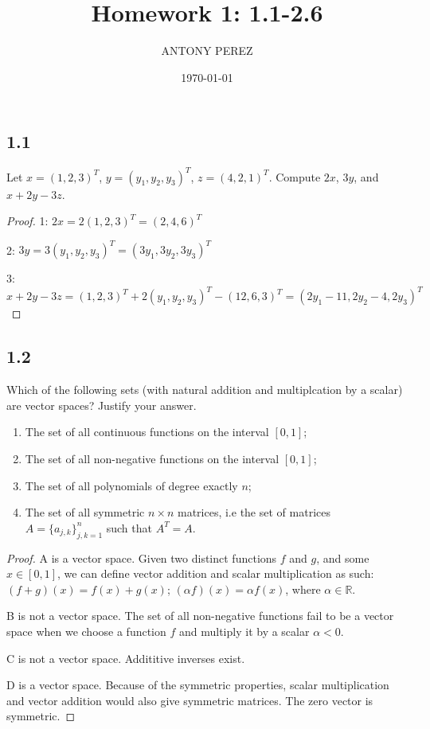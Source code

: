 \documentclass{amsart}
\title{Homework 1: 1.1-2.6}
\author{ANTONY PEREZ}
\date{\today}
\begin{document}
\maketitle
\subsection*{1.1}
Let $x = (1,2,3)^{T}$, $y=(y_1,y_2,y_3)^{T}$, $z=(4,2,1)^{T}$. Compute $2x$, $3y$, and $x+2y-3z$.
\begin{proof}
    1: $2x = 2(1,2,3)^{T} = (2,4,6)^{T}$
    
    2: $3y = 3(y_1,y_2,y_3)^{T} = (3y_1,3y_2,3y_3)^{T}$
    
    3: $x+2y-3z = (1,2,3)^{T} + 2(y_1,y_2,y_3)^{T} - (12,6,3)^{T} = (2y_1 - 11, 2y_2 - 4, 2y_3)^{T}$
\end{proof}
\subsection*{1.2} Which of the following sets (with natural addition and multiplcation by a scalar) are vector spaces? Justify your answer.
\begin{enumerate}[label=\alph*)]
    \item The set of all continuous functions on the interval $[0,1]$;
    \item The set of all non-negative functions on the interval $[0,1]$;
    \item The set of all polynomials of degree exactly $n$;
    \item The set of all symmetric $n \times n$ matrices, i.e the set of matrices $A = \{a_{j,k}\}_{j,k=1}^{n}$ such that $A^T = A$.
\end{enumerate}
\begin{proof}
    A is a vector space. Given two distinct functions $f$ and $g$, and some $x \in [0,1]$, we can define vector addition and scalar multiplication as such: $(f+g)(x) = f(x)+g(x)$; $(\alpha f)(x) = \alpha f (x)$, where $\alpha \in \mathbb{R}$. 

    B is not a vector space. The set of all non-negative functions fail to be a vector space when we choose a function $f$ and multiply it by a scalar $\alpha < 0$. 

    C is not a vector space. Addititive inverses exist. 

    D is a vector space. Because of the symmetric properties, scalar multiplication and vector addition would also give symmetric matrices. The zero vector is symmetric. 
\end{proof}
\end{document}
